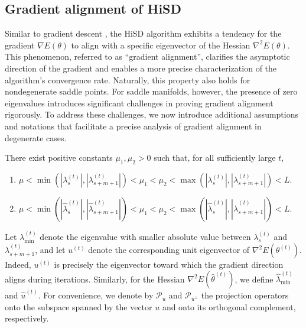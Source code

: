 \documentclass[final]{siamart251216}
\begin{document}
\subsection{Gradient alignment of HiSD}
Similar to gradient descent \cite{forsythe1968asymptotic}, the HiSD algorithm exhibits a tendency  for the gradient $\nabla E(\theta)$ to align with a specific eigenvector of the Hessian $\nabla^2E(\theta)$.
This phenomenon, referred to as ``gradient alignment'', clarifies the asymptotic direction of the gradient and enables a more precise characterization of the algorithm’s convergence rate. 
Naturally, this property also holds for nondegenerate saddle points.
For saddle manifolds, however, the presence of zero eigenvalues introduces significant challenges in proving gradient alignment rigorously. 
To address these challenges, we now introduce additional assumptions and notations that facilitate a precise analysis of gradient alignment in degenerate cases.


\begin{assumption}\label{ass:align}
There exist positive constants $\mu_{1}, \mu_{2}>0$ such that, for all sufficiently large $t$,
\begin{enumerate}
\item [(i)] 
$\mu
<\min\left(|\lambda_s^{(t)}|, |\lambda_{s+m+1}^{(t)}|\right)
<\mu_{1}<\mu_{2}
<\max\left(|\lambda_s^{(t)}|, |\lambda_{s+m+1}^{(t)}|\right)<L$. 
\item [(ii)] 
$\mu
<\min\left(|\hat{\lambda}_s^{(t)}|, |\hat{\lambda}_{s+m+1}^{(t)}|\right)
<\mu_{1}<\mu_{2}<\max\left(|\hat{\lambda}_s^{(t)}|, |\hat{\lambda}_{s+m+1}^{(t)}|\right)<L$.
\end{enumerate}
\end{assumption}
Let $\lambda_{\min}^{(t)}$ denote the eigenvalue with smaller absolute value between 
$\lambda_s^{(t)}$ and $\lambda_{s+m+1}^{(t)}$,
and let $u^{(t)}$ denote the corresponding unit eigenvector of $\nabla^2 E(\theta^{(t)})$.  
Indeed, $u^{(t)}$ is precisely the eigenvector toward which the gradient direction aligns during iterations.
Similarly, for the Hessian $\nabla^2E(\hat{\theta}^{(t)})$, we define $\hat{\lambda}_{\min}^{(t)}$ and ${\hat u}^{(t)}$.
For convenience, we denote by $\mathcal{P}_{u}$ and $\mathcal{P}_{u^\perp}$ the projection operators onto the subspace spanned by the vector $u$ and onto its orthogonal complement, respectively.
\end{document}
